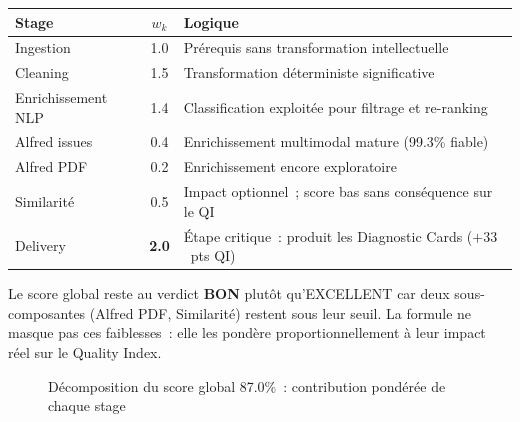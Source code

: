 \begin{longtable}{lcp{8.5cm}}
\toprule
\textbf{Stage} & $w_k$ & \textbf{Logique} \\
\midrule
Ingestion & 1.0 & Prérequis sans transformation intellectuelle \\
Cleaning & 1.5 & Transformation déterministe significative \\
Enrichissement NLP & 1.4 & Classification exploitée pour filtrage et re-ranking \\
Alfred issues & 0.4 & Enrichissement multimodal mature (99.3\% fiable) \\
Alfred PDF & 0.2 & Enrichissement encore exploratoire \\
Similarité & 0.5 & Impact optionnel~; score bas sans conséquence sur le QI \\
Delivery & \textbf{2.0} & Étape critique~: produit les Diagnostic Cards ($+33$~pts QI) \\
\bottomrule
\end{longtable}

Le score global reste au verdict \textbf{BON} plutôt qu'EXCELLENT car deux sous-composantes (Alfred PDF, Similarité) restent sous leur seuil. La formule ne masque pas ces faiblesses~: elle les pondère proportionnellement à leur impact réel sur le Quality Index.

\begin{figure}[H]
\centering
{}
\caption{Décomposition du score global 87.0\%~: contribution pondérée de chaque stage}
\label{fig:score_decomposition}
\end{figure}

